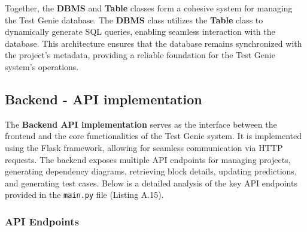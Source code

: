 Together, the \textbf{DBMS} and \textbf{Table} classes form a cohesive system for managing the Test Genie database. The \textbf{DBMS} class utilizes the \textbf{Table} class to dynamically generate SQL queries, enabling seamless interaction with the database. This architecture ensures that the database remains synchronized with the project's metadata, providing a reliable foundation for the Test Genie system's operations.

\subsection{Backend - API implementation}

The \textbf{Backend API implementation} serves as the interface between the frontend and the core functionalities of the Test Genie system. It is implemented using the Flask framework, allowing for seamless communication via HTTP requests. The backend exposes multiple API endpoints for managing projects, generating dependency diagrams, retrieving block details, updating predictions, and generating test cases. Below is a detailed analysis of the key API endpoints provided in the \texttt{main.py} file (Listing A.15).

\subsubsection{API Endpoints}

